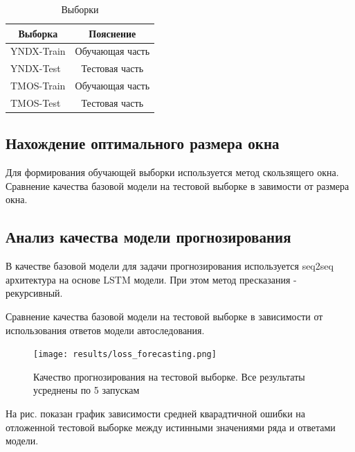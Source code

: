 \begin{table}[h!t]
\begin{center}
\caption{Выборки}
\label{table_2}
\begin{tabular}{|c|c|}
\hline
	Выборка & Пояснение \\
	\hline
	\multicolumn{1}{|l|}{YNDX-Train}
	& Обучающая часть \\
	\hline
	\multicolumn{1}{|l|}{YNDX-Test}
	& Тестовая часть \\
	\hline
	\multicolumn{1}{|l|}{TMOS-Train}
	& Обучающая часть \\
	\hline
	\multicolumn{1}{|l|}{TMOS-Test}
	& Тестовая часть \\
\hline

\end{tabular}
\end{center}
\end{table}


\subsection{Нахождение оптимального размера окна}

Для формирования обучающей выборки используется метод скользящего окна. 
Сравнение качества базовой модели на тестовой выборке в завимости от размера окна.


\subsection{Анализ качества модели прогнозирования}

В качестве базовой модели для задачи прогнозирования используется seq2seq архитектура на основе LSTM модели. При этом метод пресказания - рекурсивный.

Сравнение качества базовой модели на тестовой выборке в зависимости от использования ответов модели автоследования.

\begin{figure}[h!t]\center
{\texttt{[image: results/loss\_forecasting.png]}}
\caption{Качество прогнозирования на тестовой выборке. Все результаты усреднены по 5 запускам}
\end{figure}

На рис. показан график зависимости средней кварадтичной ошибки на отложенной тестовой выборке между истинными значениями ряда и ответами модели.

